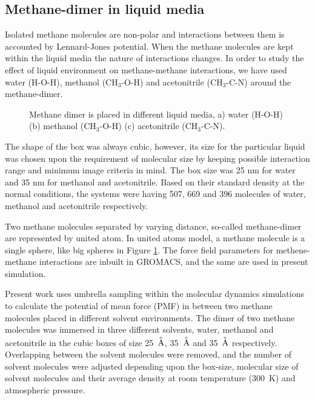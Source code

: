 \subsection{Methane-dimer in liquid media}
\label{methane-dimers}
Isolated methane molecules are non-polar and interactions between them is accounted by Lennard-Jones potential. When the methane molecules are kept within the liquid media the nature of interactions changes. In order to study the effect of liquid environment on methane-methane interactions, we have used water (H-O-H), methanol (CH$_3$-O-H) and acetonitrile (CH$_3$-C-N) around the methane-dimer.

\begin{figure}[h!]
\begin{center} 
\end{center}
\caption[Methane dimer in water (H-O-H), methanol (CH$_3$-O-H) and acetonitrile (CH$_3$-C-N).]{ Methane dimer is placed in different liquid media, a) water (H-O-H) (b) methanol (CH$_3$-O-H) (c) acetonitrile (CH$_3$-C-N). }
\label{methane-dimer}
\end{figure}

The shape of the box was always cubic, however, its size for the particular liquid was chosen upon the requirement of molecular size by keeping possible interaction range and minimum image criteria in mind. The box size was 25 nm for water and 35 nm for methanol and acetonitrile. Based on their standard density at the normal conditions, the systems were having 507, 669 and 396 molecules of water, methanol and acetonitrile respectively.

Two methane molecules separated by varying distance, so-called methane-dimer are represented by united atom.
In united atoms model, a methane molecule is a single sphere, like big spheres in Figure \ref{methane-dimer}. The 
force field parameters for methene-methane interactions are inbuilt in GROMACS, and the same are used in present simulation. 

Present work uses umbrella sampling within the molecular dynamics simulations to calculate the potential of mean force (PMF) in between two methane molecules placed in different solvent environments. The dimer of two methane molecules was immersed in three different solvents, water, methanol and acetonitrile in the cubic boxes of size 25~$\buildrel _\circ \over {\mathrm{A}}$, 35~$\buildrel _\circ \over {\mathrm{A}}$ and 35~$\buildrel _\circ \over {\mathrm{A}}$ respectively. Overlapping between the solvent molecules were removed, and the number of solvent molecules were adjusted depending upon the box-size, molecular size of solvent molecules and their average density at room temperature (300~K) and atmospheric pressure. 

